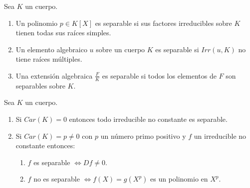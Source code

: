 \begin{definition}[Separabilidad]
Sea $K$ un cuerpo. 

\begin{enumerate}
\item Un polinomio $p \in K[X]$ es separable si sus factores irreducibles sobre $K$ tienen todas sus raíces simples. 
\item Un elemento algebraico $u$ sobre un cuerpo $K$ es separable si $Irr(u,K)$ no tiene raíces múltiples.
\item Una extensión algebraica $\frac{F}{K}$ es separable si todos los elementos de $F$ son separables sobre $K$.  
\end{enumerate}
\end{definition}

\begin{corollary}
Sea $K$ un cuerpo. 

\begin{enumerate}
\item Si $Car(K) = 0$ entonces todo irreducible no constante es separable. 
\item Si $Car(K) = p \neq 0$ con $p$ un número primo positivo y $f$ un irreducible no constante entonces:

\begin{enumerate}
\item $f$ es separable $\iff Df \neq 0$.
\item $f$ no es separable $\iff f(X) = g(X^p)$ es un polinomio en $X^p$. 
\end{enumerate}   
\end{enumerate}
\end{corollary}

